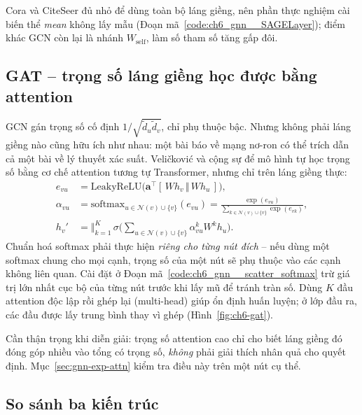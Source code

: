 Cora và CiteSeer đủ nhỏ để dùng toàn bộ láng giềng, nên phần thực nghiệm cài biến thể \emph{mean} không lấy mẫu
(Đoạn mã~\ref{code:ch6_gnn__SAGELayer}); điểm khác GCN còn lại là nhánh $W_{\text{self}}$, làm số tham số tăng gấp đôi.

\subsection{GAT -- trọng số láng giềng học được bằng attention}
\label{sec:gnn-gat}

GCN gán trọng số cố định $1/\sqrt{\tilde d_u\tilde d_v}$, chỉ phụ thuộc bậc. Nhưng không phải láng giềng nào cũng hữu
ích như nhau: một bài báo về mạng nơ-ron có thể trích dẫn cả một bài về lý thuyết xác suất. Veličković và cộng sự
\cite{ch6:velickovic2018} để mô hình tự học trọng số bằng cơ chế attention tương tự Transformer, nhưng chỉ trên láng
giềng thực:
\begin{align}
  e_{vu} &= \mathrm{LeakyReLU}\big(\mathbf a^{\top}[\,W h_v \,\Vert\, W h_u\,]\big), \\
  \alpha_{vu} &= \mathrm{softmax}_{u\in\mathcal N(v)\cup\{v\}}(e_{vu})
               = \frac{\exp(e_{vu})}{\sum_{k\in\mathcal N(v)\cup\{v\}}\exp(e_{vk})},\\
  h_v' &= \big\Vert_{k=1}^{K}\,\sigma\Big(\sum_{u\in\mathcal N(v)\cup\{v\}}\alpha_{vu}^{k}W^{k}h_u\Big).
\end{align}
Chuẩn hoá softmax phải thực hiện \emph{riêng cho từng nút đích} -- nếu dùng một softmax chung cho mọi cạnh, trọng số
của một nút sẽ phụ thuộc vào các cạnh không liên quan. Cài đặt ở Đoạn mã~\ref{code:ch6_gnn__scatter_softmax} trừ giá
trị lớn nhất cục bộ của từng nút trước khi lấy mũ để tránh tràn số. Dùng $K$ đầu attention độc lập rồi ghép lại
(multi-head) giúp ổn định huấn luyện; ở lớp đầu ra, các đầu được lấy trung bình thay vì ghép
(Hình~\ref{fig:ch6-gat}).


Cần thận trọng khi diễn giải: trọng số attention cao chỉ cho biết láng giềng đó đóng góp nhiều vào tổng có trọng số,
\emph{không} phải giải thích nhân quả cho quyết định. Mục~\ref{sec:gnn-exp-attn} kiểm tra điều này trên một nút cụ thể.

\subsection{So sánh ba kiến trúc}

